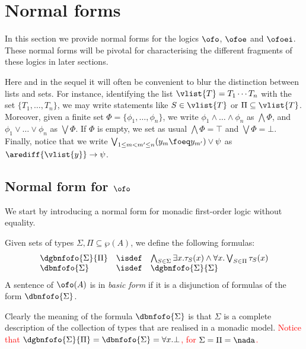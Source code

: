 
\section{Normal forms}
\label{sec:normalforms}

In this section we provide normal forms for the logics $\ofo$, $\ofoe$ and 
$\ofoei$. 
These normal forms will be pivotal for characterising the different fragments of 
these logics in later sections.
\begin{convention}
Here and in the sequel it will often be convenient to blur the distinction 
between lists and sets.
For instance, identifying the list $\vlist{T} = T_{1}\cdots T_{n}$ with the
set $\{ T_{1}, \ldots, T_{n} \}$, we may write statements like $S \in \vlist{T}$ 
or $\Pi \subseteq \vlist{T}$. 
Moreover, given a finite set $\Phi = \{\phi_1, \dots, \phi_n\}$, we write $\phi_1 \land \dots \land \phi_n$ as $\bigwedge \Phi$, and $\phi_1 \lor \dots \lor \phi_n$ as $\bigvee \Phi$. If $\Phi$ is empty, we set as usual $\bigwedge \Phi = \top$ and $\bigvee \Phi = \bot$.
Finally, notice that we write $\bigvee_{1\leq m < m^{\prime} \leq n} (y_m \foeq y_{m^{\prime}}) \lor \psi$ as $\arediff{\vlist{y}} \to \psi$. 
\end{convention}


\subsection{Normal form for $\ofo$}

We start by introducing a normal form for monadic first-order logic without 
equality.

\begin{definition}\label{def:bfofo}
Given sets of types $\Sigma, \Pi \subseteq \wp(A)$, we define the following 
formulas:
\[\begin{array}{lll}
   \dgbnfofo{\Sigma}{\Pi} &\isdef&
   \bigwedge_{S\in\Sigma} \exists x. \tau_S(x) \land 
   \forall x. \bigvee_{S\in\Pi} \tau_S(x)
\\ \dbnfofo{\Sigma}      &\isdef& \dgbnfofo{\Sigma}{\Sigma}
\end{array}\]
A sentence of $\ofo(A)$ is in \emph{basic form} if it is 
a disjunction of formulas of the form $\dbnfofo{\Sigma}$.
\end{definition}

Clearly the meaning of the formula $\dbnfofo{\Sigma}$ is that $\Sigma$ is a 
complete description of the collection of types that are realised in a monadic 
model. \textcolor{red}{Notice that $  \dgbnfofo{\Sigma}{\Pi} = \dbnfofo{\Sigma} = \forall x. \bot$, for $\Sigma =\Pi = \nada$.} 

